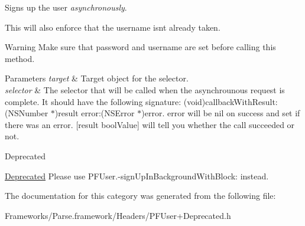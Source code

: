  





Signs up the user {\itshape asynchronously}.

This will also enforce that the username isn\textquotesingle{}t already taken.

\begin{DoxyWarning}{Warning}
Make sure that password and username are set before calling this method.
\end{DoxyWarning}

\begin{DoxyParams}{Parameters}
{\em target} & Target object for the selector. \\
\hline
{\em selector} & The selector that will be called when the asynchrounous request is complete. It should have the following signature\+: {\ttfamily (void)callback\+With\+Result\+:(\+N\+S\+Number $\ast$)result error\+:(\+N\+S\+Error $\ast$)error}. {\ttfamily error} will be {\ttfamily nil} on success and set if there was an error. {\ttfamily \mbox{[}result bool\+Value\mbox{]}} will tell you whether the call succeeded or not.\\
\hline
\end{DoxyParams}
\begin{DoxyRefDesc}{Deprecated}
\item[\hyperlink{deprecated__deprecated000039}{Deprecated}]Please use {\ttfamily P\+F\+User.-\/sign\+Up\+In\+Background\+With\+Block\+:} instead. \end{DoxyRefDesc}


The documentation for this category was generated from the following file\+:\begin{DoxyCompactItemize}
\item 
Frameworks/\+Parse.\+framework/\+Headers/P\+F\+User+\+Deprecated.\+h\end{DoxyCompactItemize}
